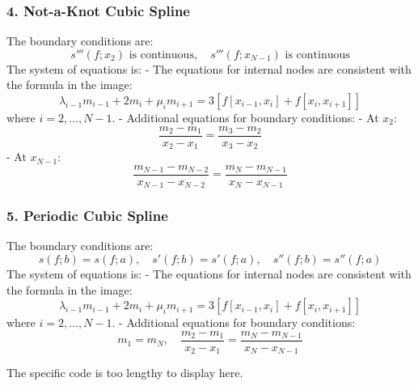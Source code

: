 \documentclass[a4paper]{article}
\begin{document}
\subsubsection{4. Not-a-Knot Cubic Spline}
The boundary conditions are:
\[
s'''(f; x_2) \text{ is continuous}, \quad s'''(f; x_{N-1}) \text{ is continuous}
\]
The system of equations is:
- The equations for internal nodes are consistent with the formula in the image:
  \[
  \lambda_{i-1} m_{i-1} + 2m_i + \mu_i m_{i+1} = 3[f[x_{i-1}, x_i] + f[x_i, x_{i+1}]]
  \]
  where \(i = 2, \dots, N-1\).
- Additional equations for boundary conditions:
  - At \(x_2\):
    \[
    \frac{m_2 - m_1}{x_2 - x_1} = \frac{m_3 - m_2}{x_3 - x_2}
    \]
  - At \(x_{N-1}\):
    \[
    \frac{m_{N-1} - m_{N-2}}{x_{N-1} - x_{N-2}} = \frac{m_N - m_{N-1}}{x_N - x_{N-1}}
    \]

\subsubsection{5. Periodic Cubic Spline}
The boundary conditions are:
\[
s(f; b) = s(f; a), \quad s'(f; b) = s'(f; a), \quad s''(f; b) = s''(f; a)
\]
The system of equations is:
- The equations for internal nodes are consistent with the formula in the image:
  \[
  \lambda_{i-1} m_{i-1} + 2m_i + \mu_i m_{i+1} = 3[f[x_{i-1}, x_i] + f[x_i, x_{i+1}]]
  \]
  where \(i = 2, \dots, N-1\).
- Additional equations for boundary conditions:
  \[
  m_1 = m_N, \quad \frac{m_2 - m_1}{x_2 - x_1} = \frac{m_N - m_{N-1}}{x_N - x_{N-1}}
  \]

The specific code is too lengthy to display here.
\end{document}
